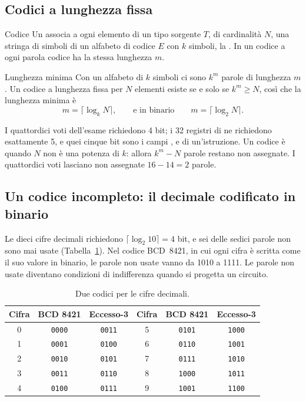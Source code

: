 \subsection{Codici a lunghezza fissa}

\begin{definition}{Codice}
Un  associa a ogni elemento di un tipo sorgente $T$, di
cardinalità $N$, una stringa di simboli di un alfabeto di codice $E$ con $k$
simboli, la . In un codice a  ogni
parola codice ha la stessa lunghezza $m$.
\end{definition}

\begin{theorem}{Lunghezza minima}
Con un alfabeto di $k$ simboli ci sono $k^{m}$ parole di lunghezza $m$. Un
codice a lunghezza fissa per $N$ elementi esiste se e solo se $k^{m}\ge N$,
così che la lunghezza minima è
\[ m=\lceil \log_k N\rceil,\qquad\text{e in binario}\qquad m=\lceil\log_2 N\rceil . \]
\end{theorem}

I quattordici voti dell'esame richiedono 4 bit; i 32 registri di \riscv ne
richiedono esattamente 5, e quei cinque bit sono i campi , 
e  di un'istruzione. Un codice è  quando $N$ non è
una potenza di $k$: allora $k^{m}-N$ parole restano non assegnate. I
quattordici voti lasciano non assegnate $16-14=2$ parole.

\subsection{Un codice incompleto: il decimale codificato in binario}

Le dieci cifre decimali richiedono $\lceil\log_2 10\rceil=4$ bit, e sei delle
sedici parole non sono mai usate (Tabella~\ref{tab:cm:bcd}). Nel codice
BCD~8421, in cui ogni cifra è scritta come il suo valore in binario, le parole
non usate vanno da 1010 a 1111. Le parole non usate diventano condizioni di
indifferenza quando si progetta un circuito.

\begin{table}[htb]
\centering\small
\caption{Due codici per le cifre decimali.}\label{tab:cm:bcd}
\begin{tabular}{@{}ccc@{\qquad\qquad}ccc@{}}
\toprule
\textbf{Cifra} & \textbf{BCD 8421} & \textbf{Eccesso-3} & \textbf{Cifra} & \textbf{BCD 8421} & \textbf{Eccesso-3}\\
\midrule
0 & \texttt{0000} & \texttt{0011} & 5 & \texttt{0101} & \texttt{1000}\\
1 & \texttt{0001} & \texttt{0100} & 6 & \texttt{0110} & \texttt{1001}\\
2 & \texttt{0010} & \texttt{0101} & 7 & \texttt{0111} & \texttt{1010}\\
3 & \texttt{0011} & \texttt{0110} & 8 & \texttt{1000} & \texttt{1011}\\
4 & \texttt{0100} & \texttt{0111} & 9 & \texttt{1001} & \texttt{1100}\\
\bottomrule
\end{tabular}
\end{table}

